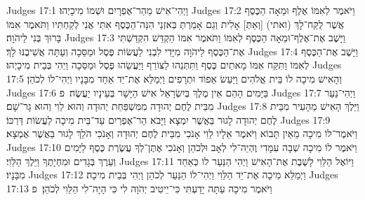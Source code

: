 Judges 17:1	וַיְהִי־אִישׁ מֵהַר־אֶפְרָיִם וּשְׁמוֹ מִיכָיְהוּ׃
Judges 17:2	וַיֹּאמֶר לְאִמּוֹ אֶלֶף וּמֵאָה הַכֶּסֶף אֲשֶׁר לֻקַּח־לָךְ (ואתי) [וְאַתְּ] אָלִית וְגַם אָמַרְתְּ בְּאזְנַי הִנֵּה־הַכֶּסֶף אִתִּי אֲנִי לְקַחְתִּיו וַתֹּאמֶר אִמּוֹ בָּרוּךְ בְּנִי לַיהֹוָה׃
Judges 17:3	וַיָּשֶׁב אֶת־אֶלֶף־וּמֵאָה הַכֶּסֶף לְאִמּוֹ וַתֹּאמֶר אִמּוֹ הַקְדֵּשׁ הִקְדַּשְׁתִּי אֶת־הַכֶּסֶף לַיהֹוָה מִיָּדִי לִבְנִי לַעֲשׂוֹת פֶּסֶל וּמַסֵּכָה וְעַתָּה אֲשִׁיבֶנּוּ לָךְ׃
Judges 17:4	וַיָּשֶׁב אֶת־הַכֶּסֶף לְאִמּוֹ וַתִּקַּח אִמּוֹ מָאתַיִם כֶּסֶף וַתִּתְּנֵהוּ לַצּוֹרֵף וַיַּעֲשֵׂהוּ פֶּסֶל וּמַסֵּכָה וַיְהִי בְּבֵית מִיכָיְהוּ׃
Judges 17:5	וְהָאִישׁ מִיכָה לוֹ בֵּית אֱלֹהִים וַיַּעַשׂ אֵפוֹד וּתְרָפִים וַיְמַלֵּא אֶת־יַד אַחַד מִבָּנָיו וַיְהִי־לוֹ לְכֹהֵן׃
Judges 17:6	בַּיָּמִים הָהֵם אֵין מֶלֶךְ בְּיִשְׂרָאֵל אִישׁ הַיָּשָׁר בְּעֵינָיו יַעֲשֶׂה׃ {פ}
Judges 17:7	וַיְהִי־נַעַר מִבֵּית לֶחֶם יְהוּדָה מִמִּשְׁפַּחַת יְהוּדָה וְהוּא לֵוִי וְהוּא גָר־שָׁם׃
Judges 17:8	וַיֵּלֶךְ הָאִישׁ מֵהָעִיר מִבֵּית לֶחֶם יְהוּדָה לָגוּר בַּאֲשֶׁר יִמְצָא וַיָּבֹא הַר־אֶפְרַיִם עַד־בֵּית מִיכָה לַעֲשׂוֹת דַּרְכּוֹ׃
Judges 17:9	וַיֹּאמֶר־לוֹ מִיכָה מֵאַיִן תָּבוֹא וַיֹּאמֶר אֵלָיו לֵוִי אָנֹכִי מִבֵּית לֶחֶם יְהוּדָה וְאָנֹכִי הֹלֵךְ לָגוּר בַּאֲשֶׁר אֶמְצָא׃
Judges 17:10	וַיֹּאמֶר לוֹ מִיכָה שְׁבָה עִמָּדִי וֶהְיֵה־לִי לְאָב וּלְכֹהֵן וְאָנֹכִי אֶתֶּן־לְךָ עֲשֶׂרֶת כֶּסֶף לַיָּמִים וְעֵרֶךְ בְּגָדִים וּמִחְיָתֶךָ וַיֵּלֶךְ הַלֵּוִי׃
Judges 17:11	וַיּוֹאֶל הַלֵּוִי לָשֶׁבֶת אֶת־הָאִישׁ וַיְהִי הַנַּעַר לוֹ כְּאַחַד מִבָּנָיו׃
Judges 17:12	וַיְמַלֵּא מִיכָה אֶת־יַד הַלֵּוִי וַיְהִי־לוֹ הַנַּעַר לְכֹהֵן וַיְהִי בְּבֵית מִיכָה׃
Judges 17:13	וַיֹּאמֶר מִיכָה עַתָּה יָדַעְתִּי כִּי־יֵיטִיב יְהֹוָה לִי כִּי הָיָה־לִי הַלֵּוִי לְכֹהֵן׃ {פ}
